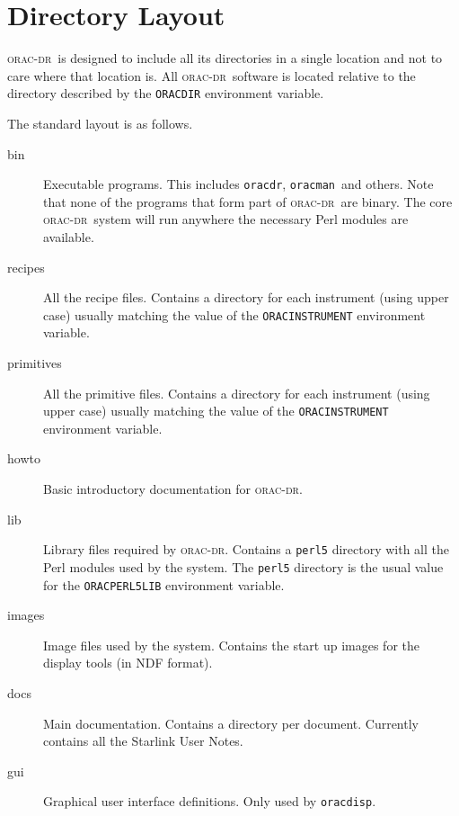 \documentclass[twoside,11pt]{article}
\renewcommand{\_}{\texttt{\symbol{95}}}
\newcommand{\Oracdr}{\textsc{orac-dr}}
\newcommand{\oracdr}{\texttt{oracdr}}
\newcommand{\oracman}{\texttt{oracman}}
\newcommand{\oracdisp}{\texttt{oracdisp}}
\begin{document}
\appendix

\section{Directory Layout}

\Oracdr\ is designed to include all its directories in a single
location and not to care where that location is. All \Oracdr\ software
is located relative to the directory described by  the \texttt{ORAC\_DIR}
environment variable.

The standard layout is as follows.

\begin{description}
\item[bin] \mbox{}

Executable programs. This includes \oracdr, \oracman\ and others. Note
that none of the programs that form part of \Oracdr\ are binary. 
The core \Oracdr\ system will run anywhere the necessary Perl modules
are available.

\item[recipes] \mbox{}

All the recipe files. Contains a directory for each instrument (using
upper case) usually matching the value of the
\texttt{ORAC\_INSTRUMENT} environment variable.

\item[primitives] \mbox{}

All the primitive files. Contains a directory for each instrument
(using upper case) usually matching the value of the
\texttt{ORAC\_INSTRUMENT} environment variable.

\item[howto] \mbox{}

Basic introductory documentation for \Oracdr.

\item[lib] \mbox{}

Library files required by \Oracdr. Contains a \texttt{perl5} directory
with all the Perl modules used by the system. The \texttt{perl5}
directory is the usual value for the \texttt{ORAC\_PERL5LIB}
environment variable.

\item[images] \mbox{}

Image files used by the system. Contains the start up images for the
display tools (in NDF format).

\item[docs] \mbox{}

Main documentation. Contains a directory per document. Currently
contains all the Starlink User Notes.

\item[gui] \mbox{}

Graphical user interface definitions. Only used by \oracdisp.

\end{description}
\end{document}
